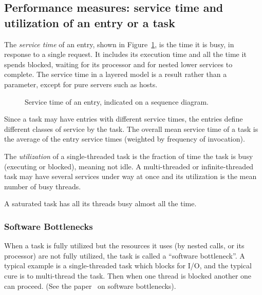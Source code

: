 \documentclass[11pt]{article}
\begin{document}
\subsection{Performance measures: service time and utilization of an entry or a task}

The \emph{service time} of an entry, shown in Figure~\ref{fig:service-time}, is the time it is busy, in response to a single request. It includes
its execution time and all the time it spends blocked, waiting for its processor and for nested lower
services to complete. The service time in a layered model is a result rather than a parameter, except
for pure servers such as hosts.

\begin{figure}
  \centering
  \qquad
  \caption{Service time of an entry, indicated on a sequence diagram.}
  \label{fig:service-time}
\end{figure}

Since a task may have entries with different service times, the entries define different classes
of service by the task. The overall mean service time of a task is the average of the entry service
times (weighted by frequency of invocation).

The \emph{utilization} of a single-threaded task is the fraction of time the task is busy (executing or
blocked), meaning not idle. A multi-threaded or infinite-threaded task may have several services
under way at once and its utilization is the mean number of busy threads.

A saturated task has all its threads busy almost all the time.

\subsubsection{Software Bottlenecks}

When a task is fully utilized but the resources it uses (by nested calls, or its processor) are not
fully utilized, the task is called a ``software bottleneck''. A typical example is a single-threaded task
which blocks for I/O, and the typical cure is to multi-thread the task. Then when one thread is
blocked another one can proceed. (See the paper~\cite{perf:franks-2006-qest-bottlenecks} on software bottlenecks).
\end{document}
